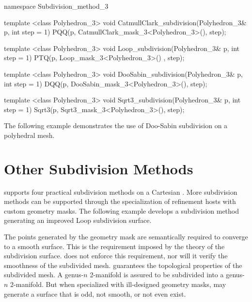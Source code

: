 \begin{ccExampleCode}
namespace Subdivision_method_3 {
  template <class Polyhedron_3>
  void CatmullClark_subdivision(Polyhedron_3& p, int step = 1) {
    PQQ(p, CatmullClark_mask_3<Polyhedron_3>(), step);
  }

  template <class Polyhedron_3>
  void Loop_subdivision(Polyhedron_3& p, int step = 1) {
    PTQ(p, Loop_mask_3<Polyhedron_3>() , step);
  }

  template <class Polyhedron_3>
  void DooSabin_subdivision(Polyhedron_3& p, int step = 1) {
    DQQ(p, DooSabin_mask_3<Polyhedron_3>(), step);
  }

  template <class Polyhedron_3>
  void Sqrt3_subdivision(Polyhedron_3& p, int step = 1) {
    Sqrt3(p, Sqrt3_mask_3<Polyhedron_3>(), step);
  }
}
\end{ccExampleCode}

The following example demonstrates the use of Doo-Sabin subdivision 
on a polyhedral mesh.

\section{Other Subdivision Methods}
 supports four practical subdivision methods on a
Cartesian . More subdivision methods can be supported
through the specialization of refinement hosts with custom geometry masks. 
The following example develops a subdivision method 
generating an improved Loop subdivision surface. 


The points generated by the geometry mask are semantically
required to converge to a smooth surface. This is the requirement
imposed by the theory of the subdivision surface.
 does not enforce this requirement, nor will
it verify the smoothness of the subdivided mesh. 
 guarantees the topological properties of 
the subdivided mesh. A genus-$n$ 2-manifold is assured to be subdivided
into a genus-$n$ 2-manifold. But when specialized with ill-designed
geometry masks,  may generate a surface that is 
odd, not smooth, or not even exist.


